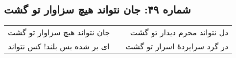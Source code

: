 \begin{center}
\section*{شماره ۴۹: جان نتواند هیچ سزاوار تو گشت}
\label{sec:049}
\begin{longtable}{l p{0.5cm} r}
جان نتواند هیچ سزاوار تو گشت
&&
دل نتواند محرم دیدار تو گشت
\\
ای بر شده بس بلند! کس نتواند
&&
در گرد سراپردهٔ اسرار تو گشت
\\
\end{longtable}
\end{center}
